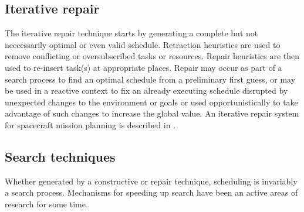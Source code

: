 \documentclass[12pt,a4paper]{article}
\begin{document}
%
%
\subsection{Iterative repair}
\label{subsect:iterative}
The iterative repair technique starts by generating a complete but not neccessarily optimal or even valid schedule. Retraction heuristics are used to remove conflicting or oversubscribed tasks or resources. Repair heuristics are then used to re-insert task(s) at appropriate places. Repair may occur as part of a search process to find an optimal schedule from a preliminary first guess, or may be used in a reactive context to fix an already executing schedule disrupted by unexpected changes to the environment or goals or used opportunistically to take advantage of such changes to increase the global value. An iterative repair system for spacecraft mission planning is described in \citep{rabideau99iterative}.

\subsection{Search techniques}
\label{subsect:search}
Whether generated by a constructive or repair technique, scheduling is invariably a search process. Mechanisms for speeding up search have been an active areas of research for some time.
\end{document}
